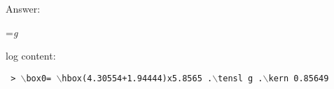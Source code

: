 Answer:

=\hbox{\sl g\/} 

log content:

{\tt\obeylines
> $\backslash$box0=
$\backslash$hbox(4.30554+1.94444)x5.8565
.$\backslash$tensl g
.$\backslash$kern 0.85649
}


\bye
